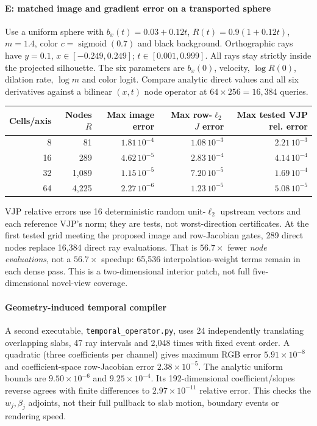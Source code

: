 \documentclass[11pt,letterpaper]{article}
\newcommand{\mini}[1]{\paragraph{#1}}
\begin{document}
\mini{E: matched image and gradient error on a transported sphere}
Use a uniform sphere with $b_x(t)=0.03+0.12t$, $R(t)=0.9(1+0.12t)$, $m=1.4$, color $c=\operatorname{sigmoid}(0.7)$ and black background. Orthographic rays have $y=0.1$, $x\in[-0.249,0.249]$; $t\in[0.001,0.999]$. All rays stay strictly inside the projected silhouette. The six parameters are $b_x(0)$, velocity, $\log R(0)$, dilation rate, $\log m$ and color logit. Compare analytic direct values and all six derivatives against a bilinear $(x,t)$ node operator at $64\times256=16{,}384$ queries.
\begin{center}\small
\begin{tabular}{@{}rrrrr@{}}
\toprule
Cells/axis & Nodes $R$ & Max image error & Max row-$\ell_2$ $J$ error & Max tested VJP rel. error\\
\midrule
8 & 81 & $1.81\,10^{-4}$ & $1.08\,10^{-3}$ & $2.21\,10^{-3}$\\
16 & 289 & $4.62\,10^{-5}$ & $2.83\,10^{-4}$ & $4.14\,10^{-4}$\\
32 & 1,089 & $1.15\,10^{-5}$ & $7.20\,10^{-5}$ & $1.69\,10^{-4}$\\
64 & 4,225 & $2.27\,10^{-6}$ & $1.23\,10^{-5}$ & $5.08\,10^{-5}$\\
\bottomrule
\end{tabular}
\end{center}
VJP relative errors use 16 deterministic random unit-$\ell_2$ upstream vectors and each reference VJP's norm; they are tests, not worst-direction certificates. At the first tested grid meeting the proposed image and row-Jacobian gates, 289 direct nodes replace 16,384 direct ray evaluations. That is $56.7\times$ fewer \emph{node evaluations}, not a $56.7\times$ speedup: 65,536 interpolation-weight terms remain in each dense pass. This is a two-dimensional interior patch, not full five-dimensional novel-view coverage.

\mini{Geometry-induced temporal compiler}
A second executable, \texttt{temporal\_operator.py}, uses 24 independently translating overlapping slabs, 47 ray intervals and 2,048 times with fixed event order. A quadratic (three coefficients per channel) gives maximum RGB error $5.91\times10^{-8}$ and coefficient-space row-Jacobian error $2.38\times10^{-5}$. The analytic uniform bounds are $9.50\times10^{-6}$ and $9.25\times10^{-4}$. Its 192-dimensional coefficient/slopes reverse agrees with finite differences to $2.97\times10^{-11}$ relative error. This checks the $w_j,\beta_j$ adjoints, not their full pullback to slab motion, boundary events or rendering speed.
\end{document}
